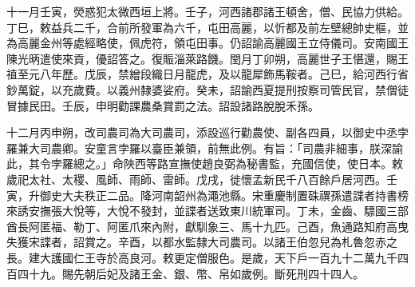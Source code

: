 \begin{pinyinscope}
 十一月壬寅，熒惑犯太微西垣上將。壬子，河西諸郡諸王頓舍，僧、民協力供給。丁巳，敕益兵二千，合前所發軍為六千，屯田高麗，以忻都及前左壁總帥史樞，並為高麗金州等處經略使，佩虎符，領屯田事。仍詔諭高麗國王立侍儀司。安南國王陳光昞遣使來貢，優詔答之。復賑淄萊路饑。閏月丁卯朔，高麗世子王愖還，賜王禃至元八年歷。戊辰，禁繒段織日月龍虎，及以龍犀飾馬鞍者。己巳，給河西行省鈔萬錠，以充歲費。以義州隸婆娑府。癸未，詔諭西夏提刑按察司管民官，禁僧徒冒據民田。壬辰，申明勸課農桑賞罰之法。詔設諸路脫脫禾孫。



 十二月丙申朔，改司農司為大司農司，添設巡行勸農使、副各四員，以御史中丞孛羅兼大司農卿。安童言孛羅以臺臣兼領，前無此例。有旨：「司農非細事，朕深諭此，其令孛羅總之。」命陜西等路宣撫使趙良弼為秘書監，充國信使，使日本。敕歲祀太社、太稷、風師、雨師、雷師。戊戌，徙懷孟新民千八百餘戶居河西。壬寅，升御史大夫秩正二品。降河南韶州為澠池縣。宋重慶制置硃禩孫遣諜者持書榜來誘安撫張大悅等，大悅不發封，並諜者送致東川統軍司。丁未，金齒、驃國三部酋長阿匿福、勒丁、阿匿爪來內附，獻馴象三、馬十九匹。己酉，魚通路知府高曳失獲宋諜者，詔賞之。辛酉，以都水監隸大司農司。以諸王伯忽兒為札魯忽赤之長。建大護國仁王寺於高良河。敕更定僧服色。是歲，天下戶一百九十二萬九千四百四十九。賜先朝后妃及諸王金、銀、幣、帛如歲例。斷死刑四十四人。




\end{pinyinscope}
